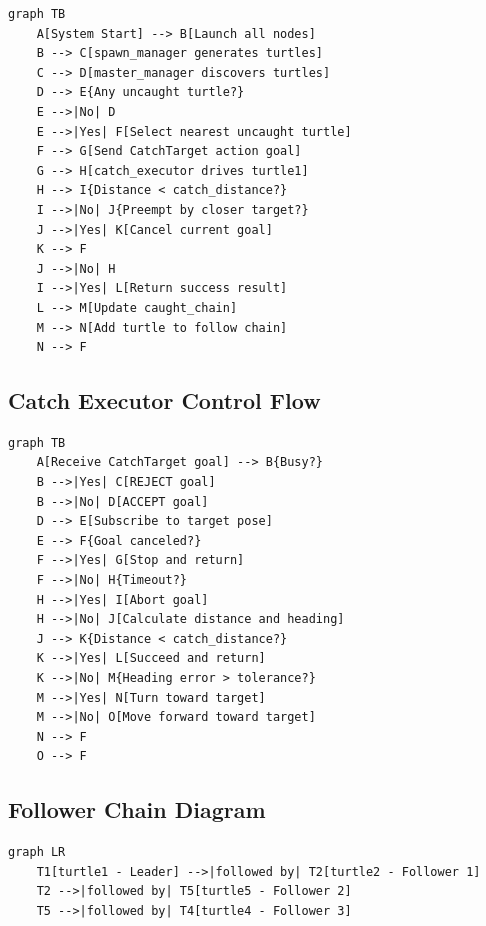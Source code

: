 \documentclass[12pt,a4paper]{article}
\begin{document}
\begin{lstlisting}[language={},title={System Operation Flow}]
graph TB
    A[System Start] --> B[Launch all nodes]
    B --> C[spawn_manager generates turtles]
    C --> D[master_manager discovers turtles]
    D --> E{Any uncaught turtle?}
    E -->|No| D
    E -->|Yes| F[Select nearest uncaught turtle]
    F --> G[Send CatchTarget action goal]
    G --> H[catch_executor drives turtle1]
    H --> I{Distance < catch_distance?}
    I -->|No| J{Preempt by closer target?}
    J -->|Yes| K[Cancel current goal]
    K --> F
    J -->|No| H
    I -->|Yes| L[Return success result]
    L --> M[Update caught_chain]
    M --> N[Add turtle to follow chain]
    N --> F
\end{lstlisting}

\subsection{Catch Executor Control Flow}

\begin{lstlisting}[language={},title={Catch Executor Control Flow}]
graph TB
    A[Receive CatchTarget goal] --> B{Busy?}
    B -->|Yes| C[REJECT goal]
    B -->|No| D[ACCEPT goal]
    D --> E[Subscribe to target pose]
    E --> F{Goal canceled?}
    F -->|Yes| G[Stop and return]
    F -->|No| H{Timeout?}
    H -->|Yes| I[Abort goal]
    H -->|No| J[Calculate distance and heading]
    J --> K{Distance < catch_distance?}
    K -->|Yes| L[Succeed and return]
    K -->|No| M{Heading error > tolerance?}
    M -->|Yes| N[Turn toward target]
    M -->|No| O[Move forward toward target]
    N --> F
    O --> F
\end{lstlisting}

\subsection{Follower Chain Diagram}

\begin{lstlisting}[language={},title={Follower Chain}]
graph LR
    T1[turtle1 - Leader] -->|followed by| T2[turtle2 - Follower 1]
    T2 -->|followed by| T5[turtle5 - Follower 2]
    T5 -->|followed by| T4[turtle4 - Follower 3]
\end{lstlisting}
\end{document}
